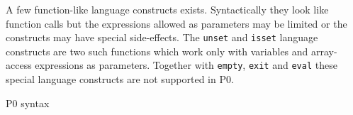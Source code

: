 A few function-like language constructs exists. Syntactically they look like function calls but the expressions allowed as parameters may be limited or the constructs may have special side-effects. The \texttt{unset} and \texttt{isset} language constructs are two such functions which work only with variables and array-access expressions as parameters. Together with \texttt{empty}, \texttt{exit} and \texttt{eval} these special language constructs are not supported in P0.

\begin{grammarf}
\centering
{\scriptsize }
\caption{P0 syntax }
\label{gramm:p0}
\end{grammarf}